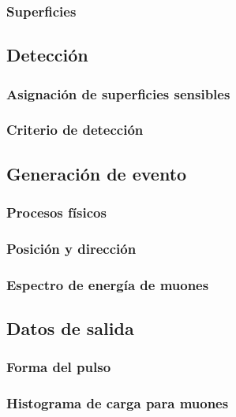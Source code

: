 \documentclass{book}
\begin{document}
\subsubsection{Superficies}

\subsection{Detecci\'on}
\subsubsection{Asignaci\'on de superficies sensibles}
\subsubsection{Criterio de detecci\'on}

\subsection{Generaci\'on de evento}
\subsubsection{Procesos f\'isicos}
\subsubsection{Posici\'on y direcci\'on}
\subsubsection{Espectro de energ\'ia de muones}

\subsection{Datos de salida}
\subsubsection{Forma del pulso}
\subsubsection{Histograma de carga para muones}




\end{document}
